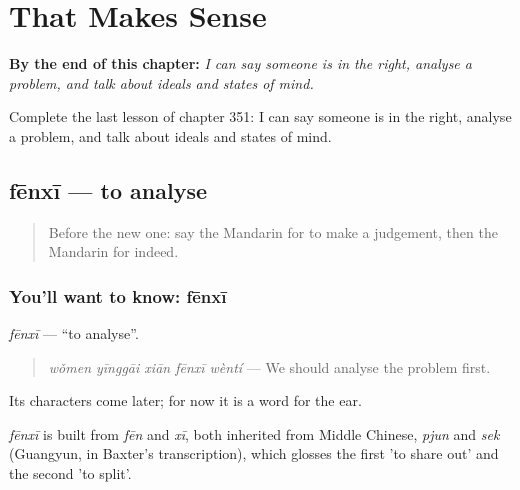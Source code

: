 
\chapter{That Makes Sense}
\label{ch:zh-that-makes-sense}

\begin{chapteropening}
\textbf{By the end of this chapter:} \emph{I can say someone is in the right, analyse a problem, and talk about ideals and states of mind.}

Complete the last lesson of chapter 351: I can say someone is in the right, analyse a problem, and talk about ideals and states of mind.
\end{chapteropening}

\section[fēnxī]{fēnxī — to analyse}

\label{lesson:ZH-C351-fenxi}



\begin{quote}
Before the new one: say the Mandarin for to make a judgement, then the Mandarin for indeed.
\end{quote}

\subsection*{You'll want to know: fēnxī}
\emph{fēnxī} — \textquotedblleft{}to analyse\textquotedblright{}.

\begin{quote}
\emph{wǒmen yīnggāi xiān fēnxī wèntí} — We should analyse the problem first.
\end{quote}

Its characters come later; for now it is a word for the ear.

\begin{cousinweb}
\emph{fēnxī} is built from \emph{fēn} and \emph{xī}, both inherited from Middle Chinese, \emph{pjun} and \emph{sek} (Guangyun, in Baxter's transcription), which glosses the first 'to share out' and the second 'to split'.
\end{cousinweb}

